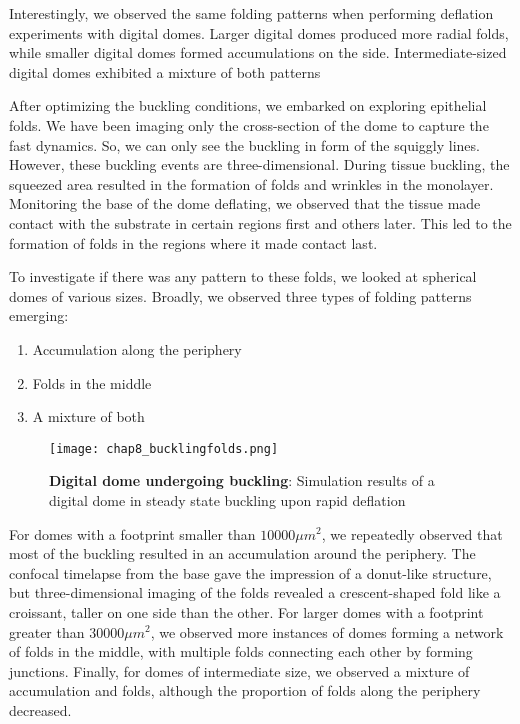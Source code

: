 Interestingly, we observed the same folding patterns when performing
deflation experiments with digital domes. Larger digital domes produced
more radial folds, while smaller digital domes formed accumulations on
the side. Intermediate-sized digital domes exhibited a mixture of both
patterns

After optimizing the buckling conditions, we embarked on exploring
epithelial folds. We have been imaging only the cross-section of the
dome to capture the fast dynamics. So, we can only see the buckling in
form of the squiggly lines. However, these buckling events are
three-dimensional. During tissue buckling, the squeezed area resulted in
the formation of folds and wrinkles in the monolayer. Monitoring the
base of the dome deflating, we observed that the tissue made contact
with the substrate in certain regions first and others later. This led
to the formation of folds in the regions where it made contact last.

To investigate if there was any pattern to these folds, we looked at
spherical domes of various sizes. Broadly, we observed three types of
folding patterns emerging:

\begin{enumerate}
	\def\labelenumi{\arabic{enumi}.}
	\item
	Accumulation along the periphery
	\item
	Folds in the middle
	\item
	A mixture of both
\end{enumerate}

\begin{figure}[h]
	\centering
	\texttt{[image: chap8\_bucklingfolds.png]}
	\caption{\label{fig_8_5} \textbf{Digital dome undergoing buckling}: Simulation results of a digital dome in steady state buckling upon rapid deflation
	}
\end{figure}
For domes with a footprint smaller than \(10000 \mu m^2\), we repeatedly
observed that most of the buckling resulted in an accumulation around
the periphery. The confocal timelapse from the base gave the impression
of a donut-like structure, but three-dimensional imaging of the folds
revealed a crescent-shaped fold like a croissant, taller on one side
than the other. For larger domes with a footprint greater than
\(30000\mu m^2\), we observed more instances of domes forming a network
of folds in the middle, with multiple folds connecting each other by
forming junctions. Finally, for domes of intermediate size, we observed
a mixture of accumulation and folds, although the proportion of folds
along the periphery decreased.


